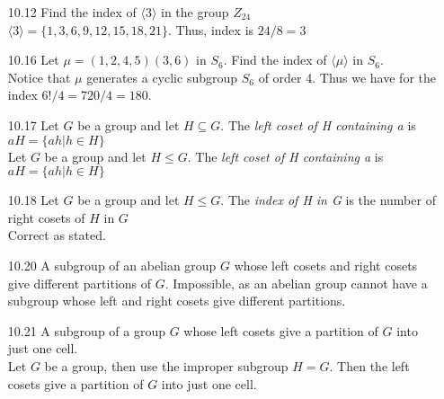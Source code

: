 \documentclass[12pt]{article}
\begin{document}
\begin{enumerate}
	 \item[10.12] Find the index of $ \langle 3 \rangle $ in the group $ Z_{24} $ \\
	 $ \langle 3 \rangle = \{1,3,6,9,12,15,18,21\}$. Thus, index is $ 24/8 = 3$
	 
	 \item[10.16] Let $ \mu = (1,2,4,5)(3,6) $ in $ S_6 $. Find the index of $ \langle \mu \rangle $ in $ S_6 $.\\
	 Notice that $ \mu $ generates a cyclic subgroup $ S_6 $ of order 4. Thus we have for the index $ 6!/4 = 720/4 = 180$.
	 
	 \item[10.17] Let $ G $ be a group and let $ H\subseteq G $. The \textit{left coset of H containing a} is $ aH = \{ah|h\in H\} $ \\
	  Let $ G $ be a group and let $ H \leq G $. The \textit{left coset of H containing a} is $ aH = \{ah|h\in H\} $
	 \item[10.18] Let $ G $ be a group and let $ H\leq G $. The \textit{index of H in G } is the number of right cosets of $ H $ in $ G $ \\
	 Correct as stated.
	 \item[10.20] A subgroup of an abelian group $ G $ whose left cosets and right cosets give different partitions of $ G $.
	 	Impossible, as an abelian group cannot have a subgroup whose left and right cosets give different partitions.
	 \item[10.21] A subgroup of a group $ G $ whose left cosets give a partition of $ G $ into just one cell. \\
	 Let $ G $ be a group, then use the improper subgroup $ H = G $. Then the left cosets give a partition of $ G $ into just one cell.
	 	

\end{enumerate}
\end{document}
